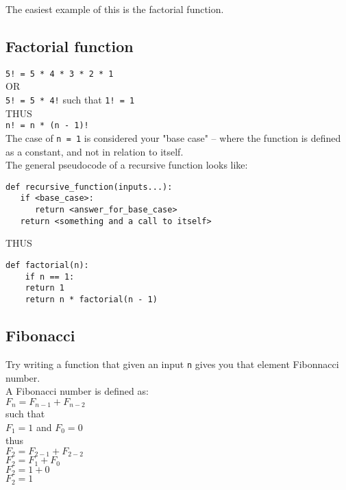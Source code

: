 \documentclass[11pt]{article}
\begin{document}
The easiest example of this is the factorial function.\\
\subsection{Factorial function}
\label{sec:orgfe7fa11}
\texttt{5! = 5 * 4 * 3 * 2 * 1}\\
OR\\
\texttt{5! = 5 * 4!} such that \texttt{1! = 1}\\
THUS\\
\texttt{n! = n * (n - 1)!}\\

The case of \texttt{n = 1} is considered your "base case" -- where the function is defined as a constant, and not in relation to itself.\\

The general pseudocode of a recursive function looks like:\\
\begin{verbatim}
def recursive_function(inputs...):
   if <base_case>:
      return <answer_for_base_case>
   return <something and a call to itself>
\end{verbatim}

THUS\\

\begin{verbatim}
def factorial(n):
    if n == 1:
	return 1
    return n * factorial(n - 1)
\end{verbatim}

\subsection{Fibonacci}
\label{sec:org53897a7}
Try writing a function that given an input \texttt{n} gives you that element Fibonnacci number.\\

A Fibonacci number is defined as:\\

\(F_n = F_{n-1} + F_{n-2}\)\\
such that\\
\(F_1 = 1\) and \(F_0 = 0\)\\
thus\\
\(F_2 = F_{2-1} + F_{2-2}\)\\
\(F_2 = F_1 + F_0\)\\
\(F_2 = 1 + 0\)\\
\(F_2 = 1\)\\
\end{document}

